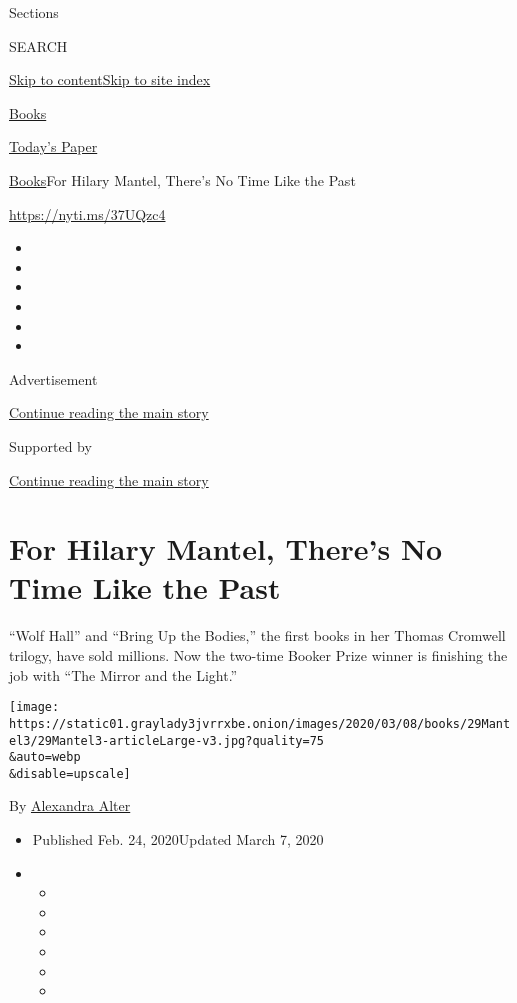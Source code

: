 Sections

SEARCH

\protect\hyperlink{site-content}{Skip to
content}\protect\hyperlink{site-index}{Skip to site index}

\href{https://www.nytimes3xbfgragh.onion/section/books}{Books}

\href{https://myaccount.nytimes3xbfgragh.onion/auth/login?response_type=cookie\&client_id=vi}{}

\href{https://www.nytimes3xbfgragh.onion/section/todayspaper}{Today's
Paper}

\href{/section/books}{Books}\textbar{}For Hilary Mantel, There's No Time
Like the Past

\url{https://nyti.ms/37UQzc4}

\begin{itemize}
\item
\item
\item
\item
\item
\item
\end{itemize}

Advertisement

\protect\hyperlink{after-top}{Continue reading the main story}

Supported by

\protect\hyperlink{after-sponsor}{Continue reading the main story}

\hypertarget{for-hilary-mantel-theres-no-time-like-the-past}{%
\section{For Hilary Mantel, There's No Time Like the
Past}\label{for-hilary-mantel-theres-no-time-like-the-past}}

``Wolf Hall'' and ``Bring Up the Bodies,'' the first books in her Thomas
Cromwell trilogy, have sold millions. Now the two-time Booker Prize
winner is finishing the job with ``The Mirror and the Light.''

\texttt{[image: https://static01.graylady3jvrrxbe.onion/images/2020/03/08/books/29Mantel3/29Mantel3-articleLarge-v3.jpg?quality=75\\\&auto=webp\\\&disable=upscale]}

By
\href{https://www.nytimes3xbfgragh.onion/by/alexandra-alter}{Alexandra
Alter}

\begin{itemize}
\item
  Published Feb. 24, 2020Updated March 7, 2020
\item
  \begin{itemize}
  \item
  \item
  \item
  \item
  \item
  \item
  \end{itemize}
\end{itemize}

